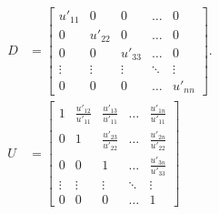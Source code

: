 \documentclass[twocolumn]{article}
\begin{document}
\begin{align*}
  D &= \begin{bmatrix}
    u'_{11} & 0  & 0  &  \dots &  0 \\
    0 & u'_{22}  & 0   &   \dots &  0 \\
    0 & 0   & u'_{33}  &   \dots &  0 \\
    \vdots &  \vdots  & \vdots  & \ddots & \vdots \\
    0 & 0  &   0   & \dots &  u'_{nn}
  \end{bmatrix}.
                       \\
  U  &=  \begin{bmatrix}
    1 & \frac{u'_{12}}{u'_{11}} & \frac{u'_{13}}{u'_{11}} &   \dots &  \frac{u'_{1n}}{u'_{11}} \\
    0 & 1  &   \frac{u'_{23}}{u'_{22}} &   \dots &  \frac{u'_{2n}}{u'_{22}} \\
    0 & 0  &   1 & \dots &  \frac{u'_{3n}}{u'_{33}} \\
    \vdots &  \vdots  & \vdots  & \ddots & \vdots \\
    0 & 0  &   0 &  \dots &  1
  \end{bmatrix}
\end{align*}
\end{document}
